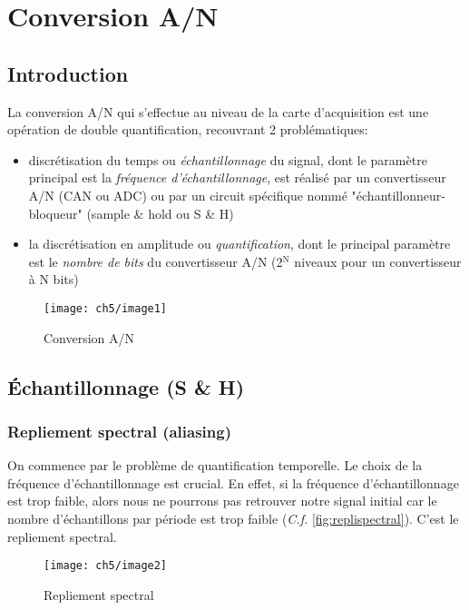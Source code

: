 \chapter{Conversion A/N}
\section{Introduction}
La conversion A/N qui s'effectue au niveau de la carte d'acquisition est une opération de double quantification, recouvrant 2 problématiques:
\begin{itemize}
	\item discrétisation du temps ou \emph{échantillonnage} du signal, dont le paramètre principal est la \emph{fréquence d'échantillonnage}, est réalisé par un convertisseur A/N (CAN ou ADC) ou par un circuit spécifique nommé "échantillonneur-bloqueur" (sample \& hold ou S \& H)
	\item la discrétisation en amplitude ou \emph{quantification}, dont le principal paramètre est le \emph{nombre de bits} du convertisseur A/N (2$^{\text{N}}$ niveaux pour un convertisseur à N bits)
\end{itemize}
\begin{figure}[H] 
	\centering 
	\texttt{[image: ch5/image1]} 
	\caption{Conversion A/N}
	\label{fig:conversionan} 
\end{figure}
\section{Échantillonnage (S \& H)}
\subsection{Repliement spectral (aliasing)}
On commence par le problème de quantification temporelle. Le choix de la fréquence d'échantillonnage est crucial. En effet, si la fréquence d'échantillonnage est trop faible, alors nous ne pourrons pas retrouver notre signal initial  car le nombre d'échantillons par période est trop faible (\textit{C.f.} \autoref{fig:replispectral}). C'est le repliement spectral.
\begin{figure}[H] 
	\centering 
	\texttt{[image: ch5/image2]} 
	\caption{Repliement spectral} 
	\label{fig:replispectral}
\end{figure}
